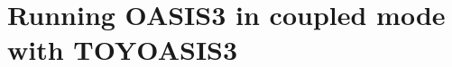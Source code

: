 %
%   
% 
% 
%
%
%
%

\section{Running OASIS3 in coupled mode with TOYOASIS3}
\label{sec_coupled_mode}

